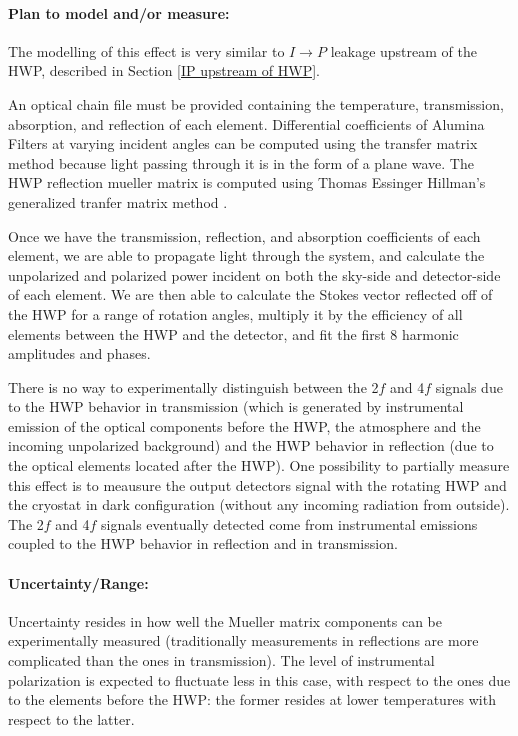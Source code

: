 \paragraph{Plan to model and/or measure:}
The modelling of this effect is very similar to $I\rightarrow P$ leakage upstream of the HWP, described in Section \ref{IP upstream of HWP}.

An optical chain file must be provided containing the temperature, transmission, absorption, and reflection of each element. 
Differential  coefficients of Alumina Filters at varying incident angles can be computed 
using the transfer matrix method because light passing through it is in the form of a plane wave.
The HWP reflection mueller matrix is computed using Thomas Essinger Hillman's generalized tranfer matrix method \cite{Essinger-Hileman2013}.

Once we have the transmission, reflection, and absorption coefficients of each element, we are able to propagate light through the system, and calculate the unpolarized and polarized power incident on both the sky-side and detector-side of each element. 
We are then able to calculate the Stokes vector reflected off of the HWP for a range of rotation angles, multiply it by the efficiency of all elements between the HWP and the detector, and fit the first 8 harmonic amplitudes and phases.


There is no way to experimentally distinguish between the 2$f$ and 4$f$ signals due to the HWP behavior in transmission (which is generated by instrumental emission of the optical components before the HWP, the atmosphere and the incoming unpolarized background) and the HWP behavior in reflection (due to the optical elements located after the HWP). One possibility to partially measure this effect is to meausure the output detectors signal with the rotating HWP and the cryostat in dark configuration (without any incoming radiation from outside).
The 2$f$ and 4$f$ signals eventually detected come from instrumental emissions coupled to the HWP behavior in reflection and in transmission. 



\paragraph{Uncertainty/Range:}
Uncertainty resides in how well the Mueller matrix components can be experimentally measured (traditionally measurements in reflections are more complicated than the ones in transmission). The level of instrumental polarization is expected to fluctuate less in this case, with respect to the ones due to the elements before the HWP: the former resides at lower temperatures with respect to the latter. 

